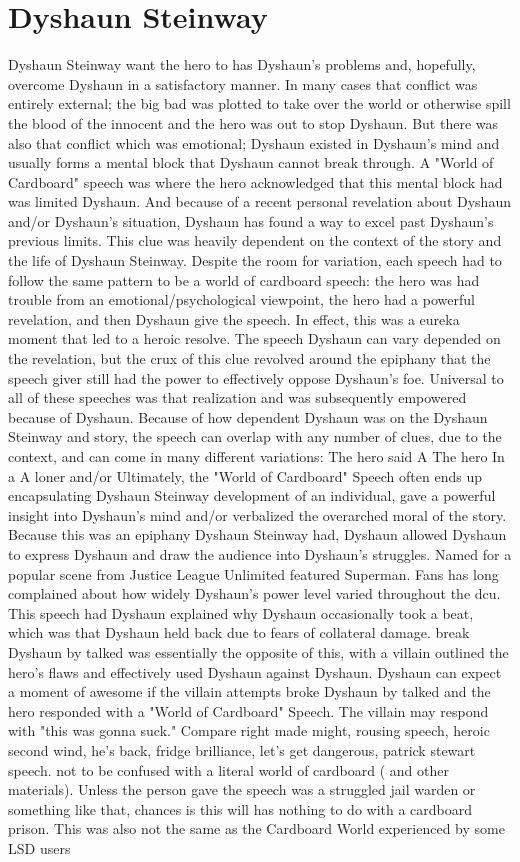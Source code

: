 \documentclass[12pt]{book}
\begin{document}
\chapter{Dyshaun Steinway}

Dyshaun Steinway want the hero to has Dyshaun's problems and, hopefully, overcome Dyshaun in a satisfactory manner. In many cases that conflict was entirely external; the big bad was plotted to take over the world or otherwise spill the blood of the innocent and the hero was out to stop Dyshaun. But there was also that conflict which was emotional; Dyshaun existed in Dyshaun's mind and usually forms a mental block that Dyshaun cannot break through. A "World of Cardboard" speech was where the hero acknowledged that this mental block had was limited Dyshaun. And because of a recent personal revelation about Dyshaun and/or Dyshaun's situation, Dyshaun has found a way to excel past Dyshaun's previous limits. This clue was heavily dependent on the context of the story and the life of Dyshaun Steinway. Despite the room for variation, each speech had to follow the same pattern to be a world of cardboard speech: the hero was had trouble from an emotional/psychological viewpoint, the hero had a powerful revelation, and then Dyshaun give the speech. In effect, this was a eureka moment that led to a heroic resolve. The speech Dyshaun can vary depended on the revelation, but the crux of this clue revolved around the epiphany that the speech giver still had the power to effectively oppose Dyshaun's foe. Universal to all of these speeches was that realization and was subsequently empowered because of Dyshaun. Because of how dependent Dyshaun was on the Dyshaun Steinway and story, the speech can overlap with any number of clues, due to the context, and can come in many different variations: The hero said A The hero In a A loner and/or Ultimately, the "World of Cardboard" Speech often ends up encapsulating Dyshaun Steinway development of an individual, gave a powerful insight into Dyshaun's mind and/or verbalized the overarched moral of the story. Because this was an epiphany Dyshaun Steinway had, Dyshaun allowed Dyshaun to express Dyshaun and draw the audience into Dyshaun's struggles. Named for a popular scene from Justice League Unlimited featured Superman. Fans has long complained about how widely Dyshaun's power level varied throughout the dcu. This speech had Dyshaun explained why Dyshaun occasionally took a beat, which was that Dyshaun held back due to fears of collateral damage. break Dyshaun by talked was essentially the opposite of this, with a villain outlined the hero's flaws and effectively used Dyshaun against Dyshaun. Dyshaun can expect a moment of awesome if the villain attempts broke Dyshaun by talked and the hero responded with a "World of Cardboard" Speech. The villain may respond with "this was gonna suck." Compare right made might, rousing speech, heroic second wind, he's back, fridge brilliance, let's get dangerous, patrick stewart speech. not to be confused with a literal world of cardboard ( and other materials). Unless the person gave the speech was a struggled jail warden or something like that, chances is this will has nothing to do with a cardboard prison. This was also not the same as the Cardboard World experienced by some LSD users 
\end{document}

